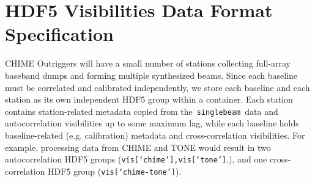 \section{HDF5 Visibilities Data Format Specification}
CHIME Outriggers will have a small number of stations collecting full-array baseband dumps and forming multiple synthesized beams. Since each baseline must be correlated and calibrated independently, we store each baseline and each station as its own independent HDF5 group within a \vlbivis container. Each station contains station-related metadata copied from the~\texttt{singlebeam}~data and autocorrelation visibilities up to some maximum lag, while each baseline holds baseline-related (e.g. calibration) metadata and cross-correlation visibilities. For example, processing data from CHIME and TONE would result in two autocorrelation HDF5 groups (\texttt{vis[`chime'],vis[`tone']},), and one cross-correlation HDF5 group (\texttt{vis[`chime-tone']}).

